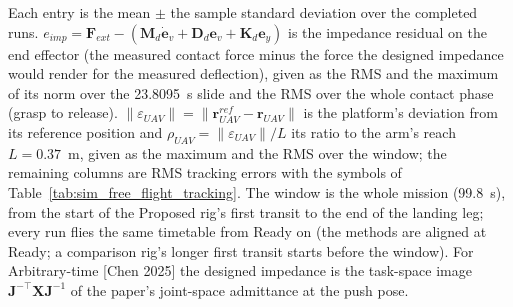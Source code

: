 \begin{table}[H]
\begin{threeparttable}
\begin{tabular}{l c c c c c c c c c c c c c c c c c c c c c c}
\bottomrule
\end{tabular}
\begin{tablenotes}
\footnotesize
\item[] Each entry is the mean $\pm$ the sample standard deviation over the completed runs. $e_{imp} = \boldsymbol{F}_{ext} - (\boldsymbol{M}_d \dot{\boldsymbol{e}}_v + \boldsymbol{D}_d \boldsymbol{e}_v + \boldsymbol{K}_d \boldsymbol{e}_y)$ is the impedance residual on the end effector (the measured contact force minus the force the designed impedance would render for the measured deflection), given as the RMS and the maximum of its norm over the 23.8095~s slide and the RMS over the whole contact phase (grasp to release). $\|\varepsilon_{UAV}\| = \|\boldsymbol{r}_{UAV}^{ref} - \boldsymbol{r}_{UAV}\|$ is the platform's deviation from its reference position and $\rho_{UAV} = \|\varepsilon_{UAV}\|/L$ its ratio to the arm's reach $L = 0.37$~m, given as the maximum and the RMS over the window; the remaining columns are RMS tracking errors with the symbols of Table~\ref{tab:sim_free_flight_tracking}. The window is the whole mission (99.8~s), from the start of the Proposed rig's first transit to the end of the landing leg; every run flies the same timetable from Ready on (the methods are aligned at Ready; a comparison rig's longer first transit starts before the window). For Arbitrary-time [Chen 2025] the designed impedance is the task-space image $\boldsymbol{J}^{-\top}\boldsymbol{X}\boldsymbol{J}^{-1}$ of the paper's joint-space admittance at the push pose.
\end{tablenotes}
\end{threeparttable}
\end{table}
